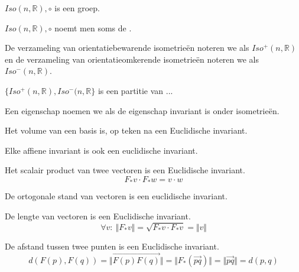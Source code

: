 \documentclass[main.tex]{subfiles}
\begin{document}
\begin{st}
  $Iso(n,\mathbb{R}),\circ$ is een groep.
\end{st}

\begin{de}
  $Iso(n,\mathbb{R}),\circ$ noemt men soms de .
\end{de}

\begin{de}
  De verzameling van orientatiebewarende isometrie\"en noteren we als $Iso^{+}(n,\mathbb{R})$ en de verzameling van orientatieomkerende isometrie\"en noteren we als $Iso^{-}(n,\mathbb{R})$.
\end{de}

\begin{st}
  $\{ Iso^{+}(n,\mathbb{R}), Iso^{-}(n,\mathbb{R} \}$ is een partitie van ...
\end{st}

\begin{de}
  Een eigenschap noemen we  als de eigenschap invariant is onder isometrie\"en.
\end{de}

\begin{st}
  Het volume van een basis is, op teken na een Euclidische invariant.
\end{st}

\begin{st}
  Elke affiene invariant is ook een euclidische invariant.
\end{st}

\begin{st}
  Het scalair product van twee vectoren is een Euclidische invariant.
\[ F_{*}v \cdot F_{*}w = v \cdot w \]
\end{st}

\begin{st}
  De ortogonale stand van vectoren is een euclidische invariant.
\end{st}

\begin{st}
  De lengte van vectoren is een Euclidische invariant.
\[ \forall v:\ \Vert F_{*}v \Vert = \sqrt{F_{*}v \cdot F_{*}v} = \Vert v \Vert \]
\end{st}

\begin{st}
  De afstand tussen twee punten is een Euclidische invariant.
\[ d(F(p),F(q)) = \Vert \overrightarrow{F(p)F(q)} \Vert = \Vert F_{*}(\overrightarrow{pq}) \Vert = \Vert \overrightarrow{pq} \Vert = d(p,q) \]
\end{st}
\end{document}

